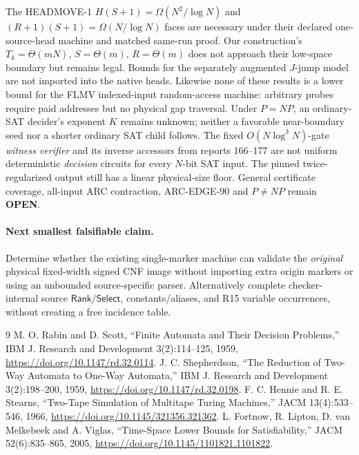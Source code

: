 \documentclass[11pt]{article}
\newcommand{\OPEN}{\textbf{OPEN}}
\begin{document}
The HEADMOVE-1 $H(S+1)=\Omega(N^2/\log N)$ and
$(R+1)(S+1)=\Omega(N/\log N)$ faces are necessary under their declared
one-source-head machine and matched same-run proof. Our construction's
$T_k=\Theta(mN)$, $S=\Theta(m)$, $R=\Theta(m)$ does not approach their
low-space boundary but remains legal. Bounds for the separately augmented
$J$-jump model are not imported into the native heads. Likewise none of
these results is a lower bound for the FLMV indexed-input random-access
machine: arbitrary probes require paid addresses but no physical gap
traversal. Under $P=NP$, an ordinary-SAT decider's exponent $K$ remains
unknown; neither a favorable near-boundary seed nor a shorter ordinary SAT
child follows. The fixed $O(N\log^3N)$-gate \emph{witness verifier} and its
inverse accessors from reports 166--177 are not uniform deterministic
\emph{decision} circuits for every $N$-bit SAT input. The pinned twice-
regularized output still has a linear physical-size floor. General certificate
coverage, all-input ARC contraction, ARC-EDGE-90 and $P\ne NP$ remain \OPEN.

\paragraph{Next smallest falsifiable claim.} Determine whether the existing
single-marker machine can validate the \emph{original} physical fixed-width
signed CNF image without importing extra origin markers or using an
unbounded source-specific parser. Alternatively complete checker-internal
source $\mathsf{Rank/Select}$, constants/aliases, and R15 variable
occurrences, without creating a free incidence table.\par

\begin{thebibliography}{9}
 M. O. Rabin and D. Scott, ``Finite Automata and Their Decision
Problems,'' IBM J. Research and Development 3(2):114--125, 1959,
\url{https://doi.org/10.1147/rd.32.0114}.
 J. C. Shepherdson, ``The Reduction of Two-Way Automata to
One-Way Automata,'' IBM J. Research and Development 3(2):198--200, 1959,
\url{https://doi.org/10.1147/rd.32.0198}.
 F. C. Hennie and R. E. Stearns, ``Two-Tape Simulation of
Multitape Turing Machines,'' JACM 13(4):533--546, 1966,
\url{https://doi.org/10.1145/321356.321362}.
 L. Fortnow, R. Lipton, D. van Melkebeek and A. Viglas,
``Time-Space Lower Bounds for Satisfiability,'' JACM 52(6):835--865, 2005,
\url{https://doi.org/10.1145/1101821.1101822}.
\end{thebibliography}
\end{document}
